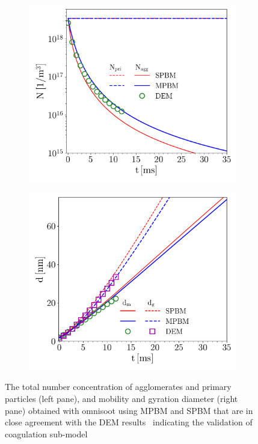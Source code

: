 \begin{figure}[!htbp]
	\centering
	\begin{subfigure}[t]{0.47\textwidth}
		\centering
		\includegraphics[width=1\textwidth]{Figures/Results/Validation/Coagulation/N_agg_pri.pdf}
	\end{subfigure}
	\begin{subfigure}[t]{0.47\textwidth}
		\centering
		\includegraphics[width=1\textwidth]{Figures/Results/Validation/Coagulation/d_mg.pdf}
	\end{subfigure}
	\caption{The total number concentration of agglomerates and primary particles (left pane), and mobility and gyration diameter (right pane) obtained with omnisoot using MPBM and SPBM that are in close agreement with the DEM results~\citep{kholghy2021surface} indicating the validation of coagulation sub-model}
	\label{fig:coagvalid_Nd}
\end{figure}


